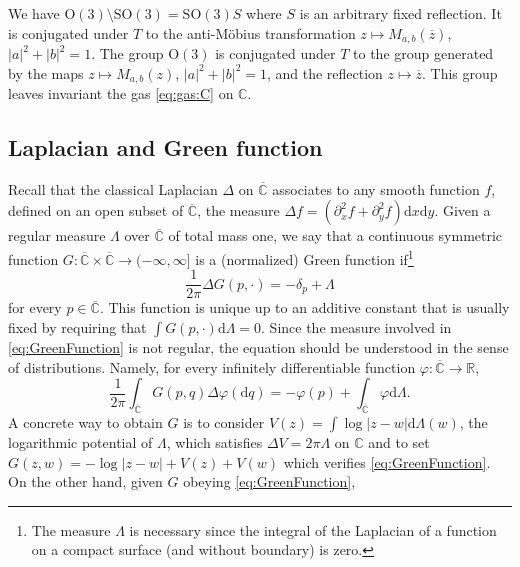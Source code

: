 \documentclass[10pt,reqno]{amsart}
\numberwithin{equation}{section}
\numberwithin{figure}{section}
\theoremstyle{plain}
\newcommand{\<}{\langle}
\renewcommand{\>}{\rangle}
\begin{document}
We have $\mathrm{O}(3)\setminus\mathrm{SO}(3)=\mathrm{SO}(3)S$ where
$S$ is an arbitrary fixed reflection. It is conjugated under $T$ to the
anti-Möbius transformation $z\mapsto M_{a,b}(\overline{z})$, $|a|^2+|b|^2=1$. The
group $\mathrm{O}(3)$ is conjugated under $T$ to the group generated by the
maps $z\mapsto M_{a,b}(z)$, $|a|^2+|b|^2=1$, and the reflection
$z\mapsto\overline{z}$. This group leaves invariant the gas
\eqref{eq:gas:C} on $\mathbb{C}$.



\subsection{Laplacian and Green function}
\label{sub:LaplaceGreen}
Recall that the classical 
Laplacian $\Delta$ on $\overline{\mathbb C}$ 
associates to any smooth function
$f$, defined on an open subset of  
$\overline{\mathbb C}$, the measure
$\Delta f = (\partial_x^2 f
+ \partial_y^2 f) 
\mathrm d x \mathrm d y$. Given a 
regular measure $\Lambda$ over
 $\overline{\mathbb C}$ of total mass one,
we say that a continuous symmetric function
$G:\overline{\mathbb C} \times \overline{\mathbb C}
\to (-\infty,\infty]$ 
is a (normalized) Green function 
if\footnote{The measure $\Lambda$ is necessary
since the integral of the Laplacian of a function on
a compact surface (and without boundary) is zero.}
\begin{equation}
\label{eq:GreenFunction}
\frac{1}{2\pi}\Delta G(p,\cdot) = -\delta_p + \Lambda
\end{equation}
for every $p \in \overline{\mathbb C}$.
This function is unique up to an additive constant
that is usually fixed by
requiring that $\int G(p,\cdot) \mathrm d \Lambda = 0$.
Since the measure involved in 
\eqref{eq:GreenFunction} is not regular,
the equation should be understood 
in the sense of distributions. Namely,
for every infinitely differentiable function
$\varphi:\overline{\mathbb C}\to\mathbb{R}$,
\begin{equation}
  \frac{1}{2\pi}\int_{\overline{\mathbb C}} G(p,q)\Delta\varphi (\mathrm d q)=
  -\varphi(p)+
  \int_{\overline{\mathbb C}}\varphi\mathrm d \Lambda.
\end{equation}
A concrete way to obtain $G$ is to consider
$V(z) = \int \log|z- w| \mathrm d \Lambda(w)$,
the logarithmic potential of $\Lambda$, which satisfies 
$\Delta V = 2\pi \Lambda$ on $\mathbb C$
and to set 
$G(z,w) =  -\log|z-w| + V(z) + V(w)$ which
verifies
\eqref{eq:GreenFunction}.
On the other hand, given $G$ obeying 
\eqref{eq:GreenFunction},
\end{document}

